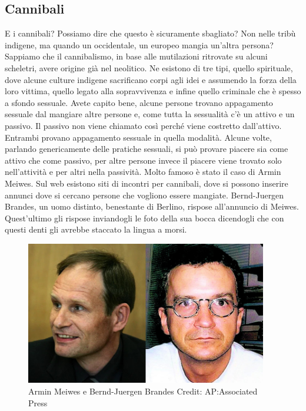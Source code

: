 \subsection{Cannibali}
E i cannibali? Possiamo dire che questo è sicuramente sbagliato? Non nelle tribù indigene, ma quando un occidentale, un
europeo mangia un'altra persona? Sappiamo che il cannibalismo, in base alle mutilazioni ritrovate
su alcuni scheletri, avere origine già nel neolitico. Ne esistono di tre tipi, quello spirituale, dove alcune culture
indigene sacrificano corpi agli idei e assumendo la forza della loro vittima, quello legato alla sopravvivenza e infine
quello criminale che è spesso a sfondo sessuale. Avete capito bene, alcune persone trovano appagamento sessuale dal
mangiare altre persone e, come tutta la sessualità c'è un attivo e un passivo. Il passivo non
viene chiamato così perché viene costretto dall'attivo. Entrambi provano appagamento sessuale in
quella modalità. Alcune volte, parlando genericamente delle pratiche sessuali, si può provare piacere sia come attivo
che come passivo, per altre persone invece il piacere viene trovato solo nell'attività e per altri
nella passività. Molto famoso è stato il caso di Armin Meiwes. Sul web esistono siti di incontri per cannibali, dove si
possono inserire annunci dove si cercano persone che vogliono essere mangiate. Bernd-Juergen Brandes, un uomo distinto,
benestante di Berlino, rispose all'annuncio di Meiwes. Quest'ultimo gli
rispose inviandogli le foto della sua bocca dicendogli che con questi denti gli avrebbe staccato la lingua a morsi. 

\needspace{4cm}
\begin{figure}
\includegraphics[width=10.552cm,height=6.258cm]{images/Libro-img055.jpg}
\caption*{Armin Meiwes e Bernd-Juergen Brandes Credit: AP:Associated Press}
\end{figure}


